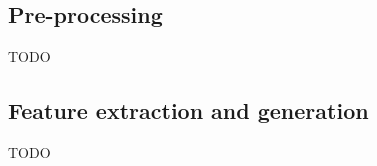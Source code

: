 \subsection{Pre-processing}
\label{subsec:bci_pipeline_training_preprocessing}




TODO


\subsection{Feature extraction and generation}
\label{subsec:bci_pipeline_training_features}
TODO

